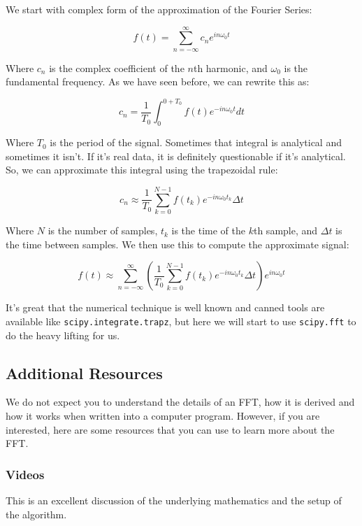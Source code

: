 We start with complex form of the approximation of the Fourier Series:

\[f(t) = \sum_{n=-\infty}^{\infty} c_n e^{i n \omega_0 t}\]

Where \(c_n\) is the complex coefficient of the \(n\)th harmonic, and
\(\omega_0\) is the fundamental frequency. As we have seen before, we
can rewrite this as:

\[c_n = \frac{1}{T_0} \int_{0}^{0 + T_0} f(t) e^{-i n \omega_0 t} dt\]

Where \(T_0\) is the period of the signal. Sometimes that integral is
analytical and sometimes it isn't. If it's real data, it is definitely
questionable if it's analytical. So, we can approximate this integral
using the trapezoidal rule:

\[c_n \approx \frac{1}{T_0} \sum_{k=0}^{N-1} f(t_k) e^{-i n \omega_0 t_k} \Delta t\]

Where \(N\) is the number of samples, \(t_k\) is the time of the \(k\)th
sample, and \(\Delta t\) is the time between samples. We then use this
to compute the approximate signal:

\[f(t) \approx \sum_{n=-\infty}^{\infty} \left( \frac{1}{T_0} \sum_{k=0}^{N-1} f(t_k) e^{-i n \omega_0 t_k} \Delta t \right) e^{i n \omega_0 t}\]

It's great that the numerical technique is well known and canned tools
are available like \texttt{scipy.integrate.trapz}, but here we will
start to use \texttt{scipy.fft} to do the heavy lifting for us.

\subsection{Additional Resources}\label{additional-resources}

We do not expect you to understand the details of an FFT, how it is
derived and how it works when written into a computer program. However,
if you are interested, here are some resources that you can use to learn
more about the FFT.

\subsubsection{Videos}\label{videos}

This is an excellent discussion of the underlying mathematics and the
setup of the algorithm.

\href{https://inv.tux.pizza/watch?v=h7apO7q16V0}{\pandocbounded{\texttt{[image: https://markdown-videos-api.jorgenkh.no/youtube/h7apO7q16V0?width=720\&height=405]}}}

